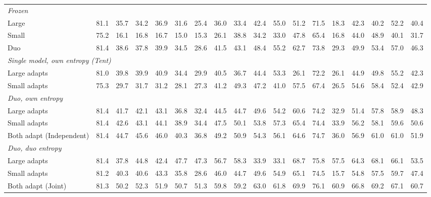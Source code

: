 \begin{table}[t]
{\begin{tabular}{l|c|ccc|cccc|cccc|cccc|c}
        \midrule
        \multicolumn{18}{l}{\textit{Frozen}} \\
        \quad Large & 81.1 & 35.7 & 34.2 & 36.9 & 31.6 & 25.4 & 36.0 & 33.4 & 42.4 & 55.0 & 51.2 & 71.5 & 18.3 & 42.3 & 40.2 & 52.2 & 40.4 \\
        \quad Small & 75.2 & 16.1 & 16.8 & 16.7 & 15.0 & 15.3 & 26.1 & 38.8 & 34.2 & 33.0 & 47.8 & 65.4 & 16.8 & 44.0 & 48.9 & 40.1 & 31.7 \\
        \quad Duo & 81.4 & 38.6 & 37.8 & 39.9 & 34.5 & 28.6 & 41.5 & 43.1 & 48.4 & 55.2 & 62.7 & 73.8 & 29.3 & 49.9 & 53.4 & 57.0 & 46.3 \\
        \midrule
        \multicolumn{18}{l}{\textit{Single model, own entropy (Tent)}} \\
        \quad Large adapts & 81.0 & 39.8 & 39.9 & 40.9 & 34.4 & 29.9 & 40.5 & 36.7 & 44.4 & 53.3 & 26.1 & 72.2 & 26.1 & 44.9 & 49.8 & 55.2 & 42.3 \\
        \quad Small adapts & 75.3 & 29.7 & 31.7 & 31.2 & 28.1 & 27.3 & 41.2 & 49.3 & 47.2 & 41.0 & 57.5 & 67.4 & 26.5 & 54.6 & 58.4 & 52.4 & 42.9 \\
        \midrule
        \multicolumn{18}{l}{\textit{Duo, own entropy}} \\
        \quad Large adapts & 81.4 & 41.7 & 42.1 & 43.1 & 36.8 & 32.4 & 44.5 & 44.7 & 49.6 & 54.2 & 60.6 & 74.2 & 32.9 & 51.4 & 57.8 & 58.9 & 48.3 \\
        \quad Small adapts & 81.4 & 42.6 & 43.1 & 44.1 & 38.9 & 34.4 & 47.5 & 50.1 & 53.8 & 57.3 & 65.4 & 74.4 & 33.9 & 56.2 & 58.1 & 59.6 & 50.6 \\
        \quad Both adapt (Independent) & 81.4 & 44.7 & 45.6 & 46.0 & 40.3 & 36.8 & 49.2 & 50.9 & 54.3 & 56.1 & 64.6 & 74.7 & 36.0 & 56.9 & 61.0 & 61.0 & 51.9 \\
        \midrule
        \multicolumn{18}{l}{\textit{Duo, duo entropy}} \\
        \quad Large adapts & 81.4 & 37.8 & 44.8 & 42.4 & 47.7 & 47.3 & 56.7 & 58.3 & 33.9 & 33.1 & 68.7 & 75.8 & 57.5 & 64.3 & 68.1 & 66.1 & 53.5 \\
        \quad Small adapts & 81.2 & 40.3 & 40.6 & 43.3 & 35.8 & 28.6 & 46.0 & 44.7 & 49.6 & 54.9 & 65.1 & 74.5 & 15.7 & 54.8 & 57.5 & 59.7 & 47.4 \\
        \quad Both adapt (Joint) & 81.3 & 50.2 & 52.3 & 51.9 & 50.7 & 51.3 & 59.8 & 59.2 & 63.0 & 61.8 & 69.9 & 76.1 & 60.9 & 66.8 & 69.2 & 67.1 & 60.7 \\
        \bottomrule
    \end{tabular}%
    }
\end{table}
